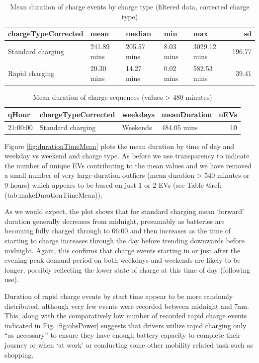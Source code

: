 \documentclass[]{article}
\begin{document}
\begin{table}[t]

\caption{\label{tab:meanDurationTable}Mean duration of charge events by charge type (filtered data, corrected charge type)}
\centering
\begin{tabular}{l|l|l|l|l|r}
\hline
chargeTypeCorrected & mean & median & min & max & sd\\
\hline
Standard charging & 241.89 mins & 205.57 mins & 8.03 mins & 3029.12 mins & 196.77\\
\hline
Rapid charging & 20.30 mins & 14.27 mins & 0.02 mins & 582.53 mins & 39.41\\
\hline
\end{tabular}
\end{table}

\begin{table}[t]

\caption{\label{tab:makeDurationTimeMean}Mean duration of charge sequences (values > 480 minutes)}
\centering
\begin{tabular}{l|l|l|l|r}
\hline
qHour & chargeTypeCorrected & weekdays & meanDuration & nEVs\\
\hline
21:00:00 & Standard charging & Weekends & 484.05 mins & 10\\
\hline
\end{tabular}
\end{table}

Figure \ref{fig:durationTimeMean} plots the mean duration by time of day and weekday vs weekend and charge type. As before we use transparency to indicate the number of unique EVs contributing to the mean values and we have removed a small number of very large duration outliers (mean duration \textgreater{} 540 minutes or 9 hours) which appears to be based on just 1 or 2 EVs (see Table @ref:(tab:makeDurationTimeMean)).

As we would expect, the plot shows that for standard charging mean `forward' duration generally decreases from midnight, presumably as batteries are becoming fully charged through to 06:00 and then increases as the time of starting to charge increases through the day before trending downwards before midnight. Again, this confirms that charge events starting in or just after the evening peak demand period on both weekdays and weekends are likely to be longer, possibly reflecting the lower state of charge at this time of day (following use).

Duration of rapid charge events by start time appear to be more randomly distributed, although very few events were recorded between midnight and 7am. This, along with the comparatively low number of recorded rapid charge events indicated in Fig. \ref{fig:obsPower} suggests that drivers utilize rapid charging only ``as necessary'' to ensure they have enough battery capacity to complete their journey or when `at work' or conducting some other mobility related task such as shopping.
\end{document}
